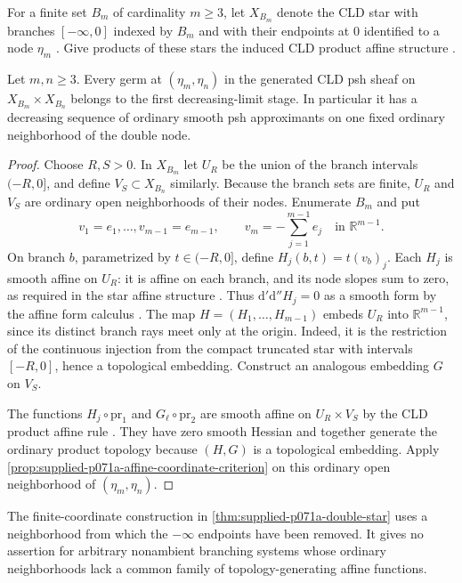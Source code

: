 For a finite set $B_m$ of cardinality $m\geq3$, let $X_{B_m}$ denote the CLD star with branches $[-\infty,0]$ indexed by $B_m$ and with their endpoints at $0$ identified to a node $\eta_m$ \cite[\S6.7.3]{CLD25}. Give products of these stars the induced CLD product affine structure \cite[\S\S6.1.3 and~9.1]{CLD25}.

\begin{theorem}
\label{thm:supplied-p071a-double-star}
Let $m,n\geq3$. Every germ at $(\eta_m,\eta_n)$ in the generated CLD psh sheaf on $X_{B_m}\times X_{B_n}$ belongs to the first decreasing-limit stage. In particular it has a decreasing sequence of ordinary smooth psh approximants on one fixed ordinary neighborhood of the double node.
\end{theorem}

\begin{proof}
Choose $R,S>0$. In $X_{B_m}$ let $U_R$ be the union of the branch intervals $(-R,0]$, and define $V_S\subset X_{B_n}$ similarly. Because the branch sets are finite, $U_R$ and $V_S$ are ordinary open neighborhoods of their nodes. Enumerate $B_m$ and put
\[
v_1=e_1,\ldots,v_{m-1}=e_{m-1},\qquad v_m=-\sum_{j=1}^{m-1}e_j
\quad\text{in }\mathbb{R}^{m-1}.
\]
On branch $b$, parametrized by $t\in(-R,0]$, define $H_j(b,t)=t(v_b)_j$. Each $H_j$ is smooth affine on $U_R$: it is affine on each branch, and its node slopes sum to zero, as required in the star affine structure \cite[\S6.7.3]{CLD25}. Thus $\mathrm{d}'\mathrm{d}''H_j=0$ as a smooth form by the affine form calculus \cite[\S3.3.11]{CLD25}. The map $H=(H_1,\ldots,H_{m-1})$ embeds $U_R$ into $\mathbb{R}^{m-1}$, since its distinct branch rays meet only at the origin. Indeed, it is the restriction of the continuous injection from the compact truncated star with intervals $[-R,0]$, hence a topological embedding. Construct an analogous embedding $G$ on $V_S$.

The functions $H_j\circ\mathrm{pr}_1$ and $G_\ell\circ\mathrm{pr}_2$ are smooth affine on $U_R\times V_S$ by the CLD product affine rule \cite[\S9.1.4]{CLD25}. They have zero smooth Hessian and together generate the ordinary product topology because $(H,G)$ is a topological embedding. Apply \cref{prop:supplied-p071a-affine-coordinate-criterion} on this ordinary open neighborhood of $(\eta_m,\eta_n)$.
\end{proof}

The finite-coordinate construction in \cref{thm:supplied-p071a-double-star} uses a neighborhood from which the $-\infty$ endpoints have been removed. It gives no assertion for arbitrary nonambient branching systems whose ordinary neighborhoods lack a common family of topology-generating affine functions.

